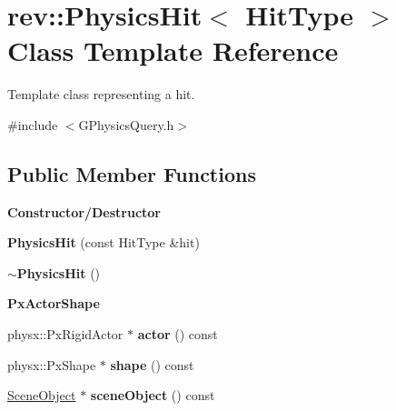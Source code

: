 \hypertarget{classrev_1_1_physics_hit}{}\section{rev\+::Physics\+Hit$<$ Hit\+Type $>$ Class Template Reference}
\label{classrev_1_1_physics_hit}


Template class representing a hit.  




{\ttfamily \#include $<$G\+Physics\+Query.\+h$>$}

\subsection*{Public Member Functions}
\begin{Indent}\textbf{ Constructor/\+Destructor}\par
\begin{DoxyCompactItemize}
\item 
\mbox{\label{classrev_1_1_physics_hit_a16c204ebd87a4b0a247cb14f83b6b602}} 
{\bfseries Physics\+Hit} (const Hit\+Type \&hit)
\item 
\mbox{\label{classrev_1_1_physics_hit_a35c33dd9496c4a0e20380245b6af1345}} 
{\bfseries $\sim$\+Physics\+Hit} ()
\end{DoxyCompactItemize}
\end{Indent}
\begin{Indent}\textbf{ Px\+Actor\+Shape}\par
\begin{DoxyCompactItemize}
\item 
\mbox{\label{classrev_1_1_physics_hit_aef5816f3f23159fa3a50ecf139950842}} 
physx\+::\+Px\+Rigid\+Actor $\ast$ {\bfseries actor} () const
\item 
\mbox{\label{classrev_1_1_physics_hit_afbc3ed96cadfd965baf7acaba09b2d68}} 
physx\+::\+Px\+Shape $\ast$ {\bfseries shape} () const
\item 
\mbox{\label{classrev_1_1_physics_hit_ae79f447effbf5be4b98feef4383ddf14}} 
\mbox{\hyperlink{classrev_1_1_scene_object}{Scene\+Object}} $\ast$ {\bfseries scene\+Object} () const
\end{DoxyCompactItemize}
\end{Indent}
